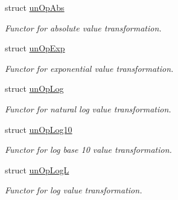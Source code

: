 \begin{DoxyCompactItemize}
struct \hyperlink{structmerlin_1_1factor_1_1unOpAbs}{un\+Op\+Abs}
\begin{DoxyCompactList}\small\item\em Functor for absolute value transformation. \end{DoxyCompactList}\item 
struct \hyperlink{structmerlin_1_1factor_1_1unOpExp}{un\+Op\+Exp}
\begin{DoxyCompactList}\small\item\em Functor for exponential value transformation. \end{DoxyCompactList}\item 
struct \hyperlink{structmerlin_1_1factor_1_1unOpLog}{un\+Op\+Log}
\begin{DoxyCompactList}\small\item\em Functor for natural log value transformation. \end{DoxyCompactList}\item 
struct \hyperlink{structmerlin_1_1factor_1_1unOpLog10}{un\+Op\+Log10}
\begin{DoxyCompactList}\small\item\em Functor for log base 10 value transformation. \end{DoxyCompactList}\item 
struct \hyperlink{structmerlin_1_1factor_1_1unOpLogL}{un\+Op\+LogL}
\begin{DoxyCompactList}\small\item\em Functor for log value transformation. \end{DoxyCompactList}\end{DoxyCompactItemize}
